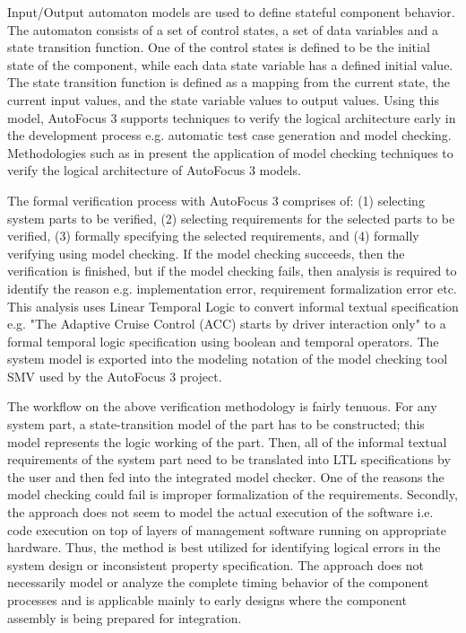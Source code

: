 Input/Output automaton models are used to define stateful component behavior. The automaton consists of a set of control states, a set of data variables and a state transition function. One of the control states is defined to be the initial state of the component, while each data state variable has a defined initial value. The state transition function is defined as a mapping from the current state, the current input values, and the state variable values to output values. Using this model, AutoFocus 3 supports techniques to verify the logical architecture early in the development process e.g. automatic test case generation and model checking. Methodologies such as in \cite{feilkas2009top} present the application of model checking techniques to verify the logical architecture of AutoFocus 3 models. 

The formal verification process with AutoFocus 3 comprises of: (1) selecting system parts to be verified, (2) selecting requirements for the selected parts to be verified, (3) formally specifying the selected requirements, and (4) formally verifying using model checking. If the model checking succeeds, then the verification is finished, but if the model checking fails, then analysis is required to identify the reason e.g. implementation error, requirement formalization error etc. This analysis uses Linear Temporal Logic \cite{gabbay1994temporal} to convert informal textual specification e.g. "The Adaptive Cruise Control (ACC) starts by driver interaction only" to a formal temporal logic specification using boolean and temporal operators. The system model is exported into the modeling notation of the model checking tool SMV \cite{mcmillan1993symbolic, mcmillan1999getting} used by the AutoFocus 3 project. 

The workflow on the above verification methodology is fairly tenuous. For any system part, a state-transition model of the part has to be constructed; this model represents the logic working of the part. Then, all of the informal textual requirements of the system part need to be translated into LTL specifications by the user and then fed into the integrated model checker. One of the reasons the model checking could fail is improper formalization of the requirements. Secondly, the approach does not seem to model the actual execution of the software i.e. code execution on top of layers of management software running on appropriate hardware. Thus, the method is best utilized for identifying logical errors in the system design or inconsistent property specification. The approach does not necessarily model or analyze the complete timing behavior of the component processes and is applicable mainly to early designs where the component assembly is being prepared for integration. 


